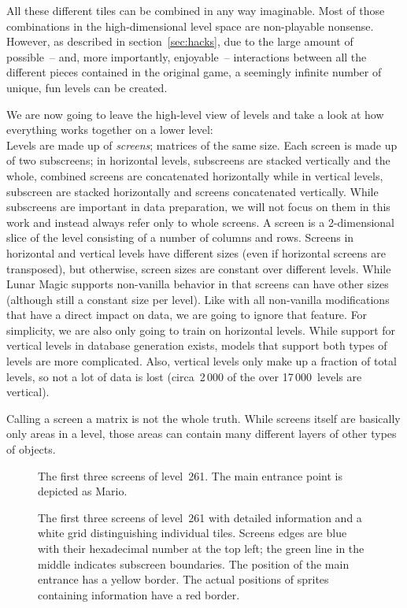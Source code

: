 All these different tiles can be combined in any way imaginable. Most
of those combinations in the high-dimensional level space are
non-playable nonsense. However, as described in
section~\ref{sec:hacks}, due to the large amount of possible~-- and,
more importantly, enjoyable~-- interactions between all the different
pieces contained in the original game, a seemingly infinite number of
unique, fun levels can be created.
\medskip

We are now going to leave the high-level view of levels and take a
look at how everything works together on a lower level: \\
Levels are made up of \emph{screens}; matrices of the same size. Each
screen is made up of two subscreens; in horizontal levels, subscreens
are stacked vertically and the whole, combined screens are
concatenated horizontally while in vertical levels, subscreen are
stacked horizontally and screens concatenated vertically. While
subscreens are important in data preparation, we will not focus on
them in this work and instead always refer only to whole screens. A
screen is a 2-dimensional slice of the level consisting of a number of
columns and rows. Screens in horizontal and vertical levels have
different sizes (even if horizontal screens are transposed), but
otherwise, screen sizes are constant over different levels. While
Lunar Magic supports non-vanilla behavior in that screens can have
other sizes (although still a constant size per level). Like with all
non-vanilla modifications that have a direct impact on data, we are
going to ignore that feature. For simplicity, we are also only going
to train on horizontal levels. While support for vertical levels in
database generation exists, models that support both types of levels
are more complicated. Also, vertical levels only make up a fraction of
total levels, so not a lot of data is lost (circa~2\,000 of the over
17\,000~levels are vertical).

Calling a screen a matrix is not the whole truth. While screens itself
are basically only areas in a level, those areas can contain many
different layers of other types of objects.

\begin{figure}[t]
  \centering
  \caption{The first three screens of level~261. The main entrance
    point is depicted as Mario.}
  \label{fig:105-clean}
\end{figure}

\begin{figure}[t]
  \centering
  \caption{The first three screens of level~261 with detailed
    information and a white grid distinguishing individual tiles.
    Screens edges are blue with their hexadecimal number at the top
    left; the green line in the middle indicates subscreen boundaries.
    The position of the main entrance has a yellow border. The actual
    positions of sprites containing information have a red border.}
  \label{fig:105-detailed}
\end{figure}

